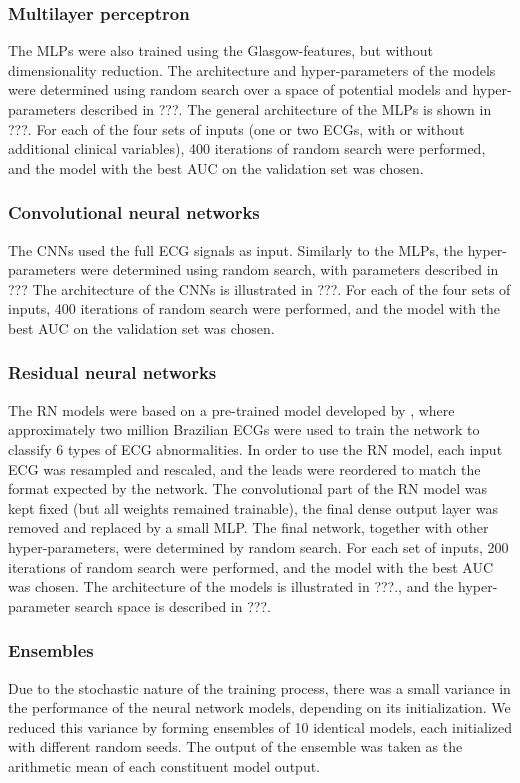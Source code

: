 \documentclass[preprint]{elsarticle}
\begin{document}
\subsubsection{Multilayer perceptron}
The MLPs were also trained using the Glasgow-features, but without dimensionality reduction. The architecture and hyper-parameters of the models were determined using random search over a space of potential models and hyper-parameters described in ???. The general architecture of the MLPs is shown in ???. For each of the four sets of inputs (one or two ECGs, with or without additional clinical variables), 400 iterations of random search were performed, and the model with the best AUC on the validation set was chosen. 

\subsubsection{Convolutional neural networks}
The CNNs used the full ECG signals as input. Similarly to the MLPs, the hyper-parameters were determined using random search, with parameters described in ??? The architecture of the CNNs is illustrated in ???. For each of the four sets of inputs, 400 iterations of random search were performed, and the model with the best AUC on the validation set was chosen. 

\subsubsection{Residual neural networks}
The RN models were based on a pre-trained model developed by \citet{ribeiro2020}, where approximately two million Brazilian ECGs were used to train the network to classify 6 types of ECG abnormalities. In order to use the RN model, each input ECG was resampled and rescaled, and the leads were reordered to match the format expected by the network. The convolutional part of the RN model was kept fixed (but all weights remained trainable), the final dense output layer was removed and replaced by a small MLP. The final network, together with other hyper-parameters, were determined by random search. For each set of inputs, 200 iterations of random search were performed, and the model with the best AUC was chosen. The architecture of the models is illustrated in ???., and the hyper-parameter search space is described in ???.

\subsubsection{Ensembles}
Due to the stochastic nature of the training process, there was a small variance in the performance of the neural network models, depending on its initialization. We reduced this variance by forming ensembles of 10 identical models, each initialized with different random seeds. The output of the ensemble was taken as the arithmetic mean of each constituent model output.
\end{document}
